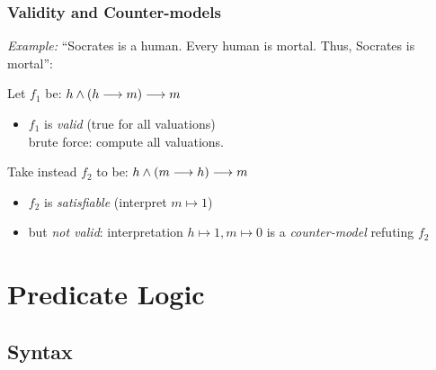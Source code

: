 \documentclass{beamer}
\begin{document}
\begin{frame}[fragile]\frametitle{Validity and Counter-models}

  \emph{Example:} ``Socrates is a human. Every human is mortal. Thus, Socrates is mortal'':

  \vspace{3mm}
  Let $f_1$ be: $h \wedge (h \longrightarrow m) \longrightarrow m$

  \begin{itemize}
  \item $f_1$ is \emph{valid} (true for all valuations)\\
    brute force: compute all valuations.
  \end{itemize}


  \vspace{3mm}
  Take instead $f_2$ to be: $h \wedge (m \longrightarrow h) \longrightarrow m$

  \begin{itemize}
  \item $f_2$ is \emph{satisfiable} (interpret $m \mapsto 1$)
  \item but \emph{not valid}: 
    interpretation $h \mapsto 1, m \mapsto 0$ is a \emph{counter-model}
    refuting $f_2$
  \end{itemize}
  
  
\end{frame}


\section{Predicate Logic}


\subsection{Syntax}
\end{document}
